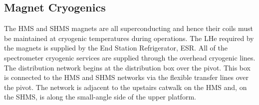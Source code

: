 \begin{table}
  \begin{center}
    \caption{Characteristics of the SHMS Magnets\label{tab:magnet_parameters}}
  \end{center}
\end{table}

\subsection {Magnet Cryogenics}

The HMS and SHMS magnets are all
superconducting and hence their coils must be maintained at
cryogenic temperatures during operations. The LHe required by the magnets
is supplied by the End Station Refrigerator, ESR.
All of the spectrometer cryogenic services are supplied through the overhead
cryogenic lines. The distribution network begins at the distribution
box over the pivot. This box is connected to the HMS and SHMS networks via the
flexible transfer lines over the pivot. The network is adjacent to
the upstairs catwalk on the HMS and, on the SHMS, is along the small-angle side
of the upper platform.

